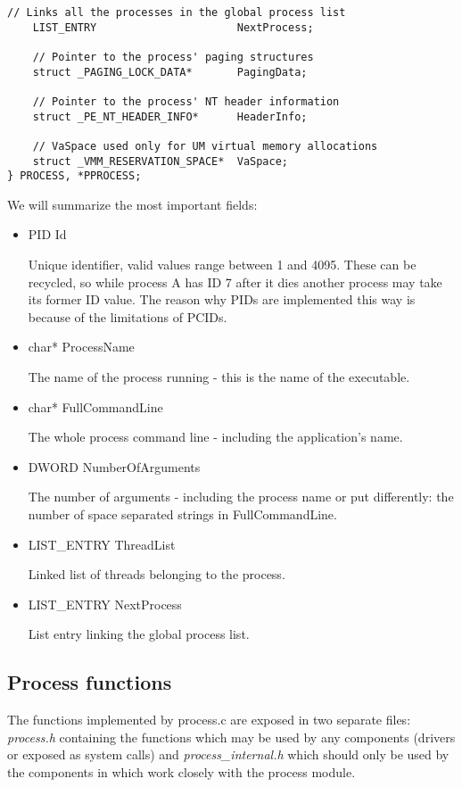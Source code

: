 \begin{appendices}
\begin{lstlisting}[caption={Process Structure},label={lst:ProcessStruct}]
    // Links all the processes in the global process list
    LIST_ENTRY                      NextProcess;

    // Pointer to the process' paging structures
    struct _PAGING_LOCK_DATA*       PagingData;

    // Pointer to the process' NT header information
    struct _PE_NT_HEADER_INFO*      HeaderInfo;

    // VaSpace used only for UM virtual memory allocations
    struct _VMM_RESERVATION_SPACE*  VaSpace;
} PROCESS, *PPROCESS;
\end{lstlisting}

We will summarize the most important fields:
\begin{itemize}
	\item PID Id

	Unique identifier, valid values range between 1 and 4095. These can be recycled, so while
process A has ID 7 after it dies another process may take its former ID value. The reason why PIDs
are implemented this way is because of the limitations of PCIDs.

	\item char* ProcessName

	The name of the process running - this is the name of the executable.

	\item char* FullCommandLine

	The whole process command line - including the application's name.

	\item DWORD NumberOfArguments

	The number of arguments - including the process name or put differently: the number of space
separated strings in FullCommandLine.

	\item LIST\_ENTRY ThreadList

	Linked list of threads belonging to the process.

	\item LIST\_ENTRY NextProcess

	List entry linking the global process list.
\end{itemize}

\subsection{Process functions}

The functions implemented by process.c are exposed in two separate files: \textit{process.h}
containing the functions which may be used by any components (drivers or exposed as system calls)
and \textit{process\_internal.h} which should only be used by the components in \projectname which
work closely with the process module.


\end{appendices}
